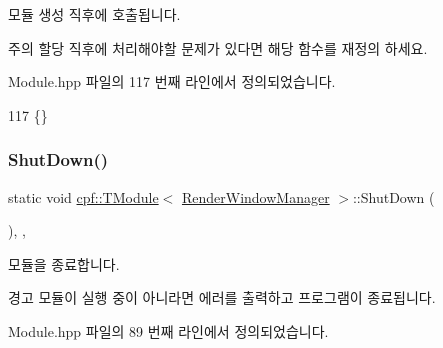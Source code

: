 모듈 생성 직후에 호출됩니다. \begin{DoxyNote}{주의}
할당 직후에 처리해야할 문제가 있다면 해당 함수를 재정의 하세요. 
\end{DoxyNote}


Module.\+hpp 파일의 117 번째 라인에서 정의되었습니다.


\begin{DoxyCode}
117 \{\}
\end{DoxyCode}
\mbox{\label{classcpf_1_1_t_module_a61452801c61e2546b75a7a6a545e82ee}} 
\subsubsection{\texorpdfstring{Shut\+Down()}{ShutDown()}}
{\footnotesize\ttfamily static void \hyperlink{classcpf_1_1_t_module}{cpf\+::\+T\+Module}$<$ \hyperlink{classcpf_1_1_render_window_manager}{Render\+Window\+Manager}  $>$\+::Shut\+Down (\begin{DoxyParamCaption}{ }\end{DoxyParamCaption})\hspace{0.3cm}{\ttfamily [inline]}, {\ttfamily [static]}, {\ttfamily [inherited]}}

모듈을 종료합니다. \begin{DoxyWarning}{경고}
모듈이 실행 중이 아니라면 에러를 출력하고 프로그램이 종료됩니다. 
\end{DoxyWarning}


Module.\+hpp 파일의 89 번째 라인에서 정의되었습니다.


